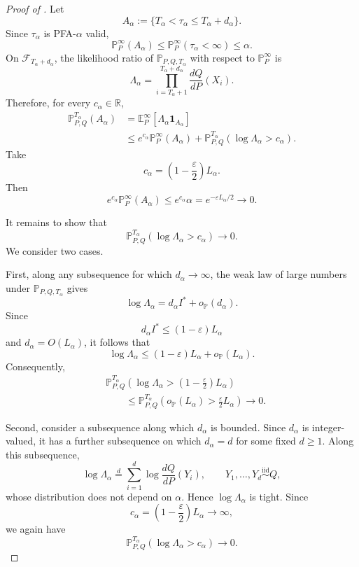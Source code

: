 \documentclass[12pt]{article}
\theoremstyle{spaced}
\theoremstyle{remark}
\newcommand{\calF}{\mathcal F}
\newcommand{\Pinf}[1]{\mathbb P_{#1}^{\infty}}
\newcommand{\Pchg}[3]{\mathbb P_{#1,#2,#3}}
\begin{document}
\begin{proof}[Proof of ]
Let
\[
    A_\alpha
    :=
    \{T_\alpha<\tau_\alpha\le T_\alpha+d_\alpha\}.
\]
Since \(\tau_\alpha\) is PFA-\(\alpha\) valid,
\[
    \Pinf{P}(A_\alpha)
    \le
    \Pinf{P}(\tau_\alpha<\infty)
    \le \alpha.
\]
On \(\calF_{T_\alpha+d_\alpha}\), the likelihood ratio of
\(\Pchg{P}{Q}{T_\alpha}\) with respect to \(\Pinf{P}\) is
\[
    \Lambda_\alpha
    =
    \prod_{i=T_\alpha+1}^{T_\alpha+d_\alpha}
    \frac{dQ}{dP}(X_i).
\]
Therefore, for every \(c_\alpha\in\mathbb R\),
\begin{align}
    \mathbb P_{P,Q}^{T_\alpha}(A_\alpha)
    &=
    \mathbb E^\infty_P
    \left[
        \Lambda_\alpha\mathbf 1_{A_\alpha}
    \right]
    \nonumber\\
    &\le
    e^{c_\alpha}\Pinf{P}(A_\alpha)
    +
    \mathbb P_{P,Q}^{T_\alpha}
    (\log\Lambda_\alpha>c_\alpha).
    \label{eq:pointwise-lower-com}
\end{align}
Take
\[
    c_\alpha
    =
    \left(1-\frac{\varepsilon}{2}\right)L_\alpha.
\]
Then
\[
    e^{c_\alpha}\Pinf{P}(A_\alpha)
    \le
    e^{c_\alpha}\alpha
    =
    e^{-\varepsilon L_\alpha/2}
    \longrightarrow0.
\]

It remains to show that
\[
    \mathbb P_{P,Q}^{T_\alpha}
    (\log\Lambda_\alpha>c_\alpha)
    \longrightarrow0.
\]
We consider two cases.

First, along any subsequence for which \(d_\alpha\to\infty\), the
weak law of large numbers under \(\Pchg{P}{Q}{T_\alpha}\) gives
\[
    \log\Lambda_\alpha
    =
    d_\alpha I^*
    +
    o_{\mathbb P}(d_\alpha).
\]
Since
\[
    d_\alpha I^*
    \le
    (1-\varepsilon)L_\alpha
\]
and \(d_\alpha=O(L_\alpha)\), it follows that
\[
    \log\Lambda_\alpha
    \le
    (1-\varepsilon)L_\alpha
    +
    o_{\mathbb P}(L_\alpha).
\]
Consequently,
\begin{align*}
&\mathbb P_{P,Q}^{T_\alpha}
\left(
    \log\Lambda_\alpha
    >
    \left(1-\frac{\varepsilon}{2}\right)L_\alpha
\right)\\
&\qquad\le
\mathbb P_{P,Q}^{T_\alpha}
\left(
    o_{\mathbb P}(L_\alpha)
    >
    \frac{\varepsilon}{2}L_\alpha
\right)
\longrightarrow0.
\end{align*}

Second, consider a subsequence along which \(d_\alpha\) is bounded.
Since \(d_\alpha\) is integer-valued, it has a further subsequence on
which \(d_\alpha=d\) for some fixed \(d\ge1\). Along this subsequence,
\[
    \log\Lambda_\alpha
    \stackrel{d}{=}
    \sum_{i=1}^{d}
    \log\frac{dQ}{dP}(Y_i),
    \qquad
    Y_1,\ldots,Y_d\stackrel{\mathrm{iid}}{\sim}Q,
\]
whose distribution does not depend on \(\alpha\). Hence
\(\log\Lambda_\alpha\) is tight. Since
\[
    c_\alpha
    =
    \left(1-\frac{\varepsilon}{2}\right)L_\alpha
    \longrightarrow\infty,
\]
we again have
\[
    \mathbb P_{P,Q}^{T_\alpha}
    (\log\Lambda_\alpha>c_\alpha)
    \longrightarrow0.
\]


\end{proof}
\end{document}
